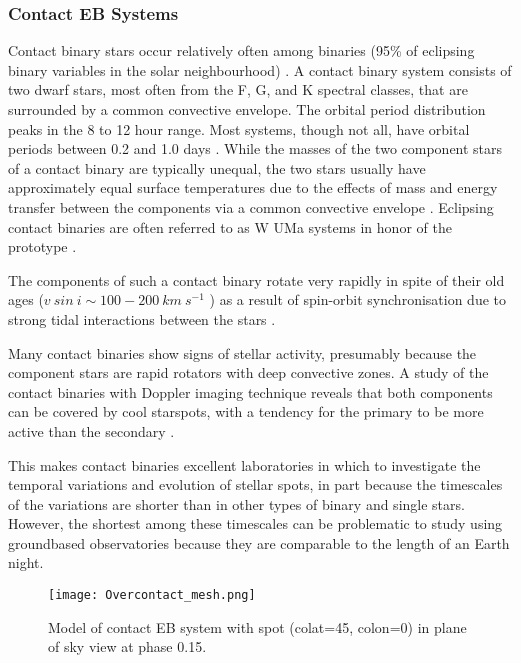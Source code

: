 \subsubsection{Contact EB Systems}
Contact binary stars occur relatively often among binaries (95\% of eclipsing binary
variables in the solar neighbourhood) \cite{Rucinski98}. 
A contact binary system consists of two dwarf stars, most often from the F, G, and K
spectral classes, that are surrounded by a common convective envelope. 
The orbital period distribution peaks in the 8 to 12 hour range. Most systems, though not all,
have orbital periods between 0.2 and 1.0 days \citep{Maceroni96, Paczynski2006}. 
While the masses of the two component stars of a contact binary
are typically unequal, the two stars usually have approximately equal surface temperatures due to the effects of
mass and energy transfer between the components via a common convective envelope \citep{Lucy68}. 
Eclipsing contact binaries are often referred to as W UMa systems in honor of the prototype \citep{Tran2013}.

The components of such a contact binary rotate very rapidly in spite of their old ages
($v~sin~i \sim 100 - 200~ km~s^{-1}$ ) as a result of spin-orbit synchronisation due to strong tidal interactions between the stars \citep{Berdyugina2005}. 

Many contact binaries show signs of stellar activity, presumably because the component stars are rapid
rotators with deep convective zones. 
A study of the contact binaries with Doppler imaging
technique reveals that both components can be covered by cool starspots, with
a tendency for the primary to be more active than the secondary \citep{Maceroni94, Hendry2000, Barnes2004}.

This makes contact binaries excellent laboratories in
which to investigate the temporal variations and evolution of stellar spots, in part because the timescales of
the variations are shorter than in other types of binary and single stars. 
However, the shortest among these timescales can be problematic to study using groundbased observatories because they are comparable to the
length of an Earth night.

\begin{figure}[!h]
\vspace{0cm}
\centerline{\texttt{[image: Overcontact\_mesh.png]}}
\caption{Model of contact EB system with spot (colat=45\degree, colon=0\degree) in plane of sky view at phase 0.15.}
\label{fig:eb_overcont_model}
\end{figure}


